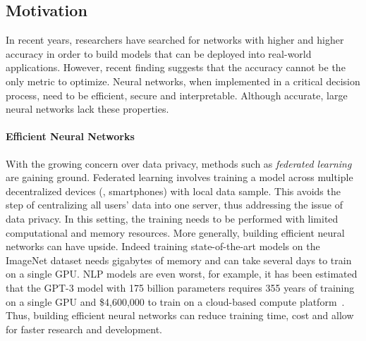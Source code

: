 %
%
%
%
%

\subsection{Motivation}
\label{subsection:ch1-motivation}




In recent years, researchers have searched for networks with higher and higher accuracy in order to build models that can be deployed into real-world applications. 
However, recent finding suggests that the accuracy cannot be the only metric to optimize. 
Neural networks, when implemented in a critical decision process, need to be efficient, secure and interpretable.
Although accurate, large neural networks lack these properties.

\paragraph{Efficient Neural Networks}
With the growing concern over data privacy, methods such as \emph{federated learning} are gaining ground.
Federated learning involves training a model across multiple decentralized devices (\eg, smartphones) with local data sample. 
This avoids the step of centralizing all users' data into one server, thus addressing the issue of data privacy.  
In this setting, the training needs to be performed with limited computational and memory resources. 
More generally, building efficient neural networks can have upside.
Indeed training state-of-the-art models on the ImageNet dataset needs gigabytes of memory and can take several days to train on a single GPU. 
NLP models are even worst, for example, it has been estimated that the GPT-3 model with 175 billion parameters requires 355 years of training on a single GPU and \$4,600,000 to train on a cloud-based compute platform~\cite{li2020overview}.
Thus, building efficient neural networks can reduce training time, cost and allow for faster research and development.


